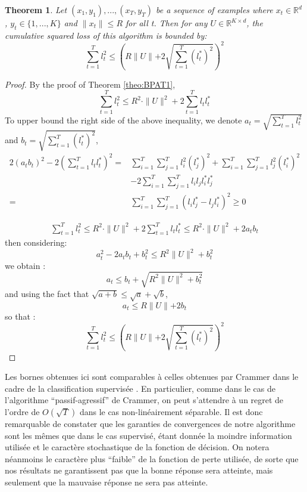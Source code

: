 \documentclass[preprint,12pt,authoryear]{elsarticle}
\newtheorem{theorem}{Theorem}
\begin{document}
\begin{theorem}
	\label{theo:BPAT2}
	Let $(x_1,y_1),...,(x_T,y_T) $ be a sequence of examples where  $x_t\in \mathbb{R}^d$, $y_t \in \{1,...,K\}$ and $\parallel{x_t}\parallel \leqslant R$ for all t. Then for any  $U \in \mathbb{R}^{K\times d}$, the cumulative squared loss of this algorithm is bounded by:
	\[\sum_{t=1}^{T}l_t^2 \leqslant \left(R\parallel{U}\parallel+2 \sqrt{\sum_{t=1}^{T}(l_t^{\ast})^2}\right)^2 \]
\end{theorem}
\begin{proof}
	By the proof of Theorem \ref{theo:BPAT1}, 
	\[\sum_{t=1}^{T}l_t^2 \leqslant R^2\cdot \parallel{U}\parallel^2 + 2\sum_{t=1}^{T}l_t l_t^{\ast}\]
	To upper bound the right side of the above inequality, we denote $a_t = \sqrt{\sum_{t=1}^{T}l_t^2}$ and $b_t = \sqrt{\sum_{t=1}^{T}(l_t^{\ast})^2}$, 
	\begin{align}
	2(a_tb_t)^2-2(\sum_{t=1}^{T}l_tl_t^{\ast})^2 =& \sum_{i=1}^{T}\sum_{j=1}^{T}l_i^2(l_j^{\ast})^2+\sum_{i=1}^{T}\sum_{j=1}^{T}l_j^2(l_i^{\ast})^2 \nonumber\\
	&- 2\sum_{i=1}^{T}\sum_{j=1}^{T}l_il_jl_i^{\ast}l_j^{\ast}\nonumber\\
	=& \sum_{i=1}^{T}\sum_{j=1}^{T}(l_il_j^{\ast}-l_jl_i^{\ast})^2 \geqslant 0 \nonumber
	\end{align}
	
	\begin{align}
	\sum_{t=1}^{T}l_t^2 \leqslant R^2 \cdot \parallel{U}\parallel^2+2\sum_{t=1}^{T}l_tl_t^{\ast}\leqslant R^2 \cdot \parallel{U}\parallel^2+2a_tb_t\nonumber
	\end{align}
	then considering:
	\[a_t^2 -2 a_tb_t+b_t^2\leqslant R^2\parallel{U}\parallel^2+b_t^2\]
	we obtain :
	\[a_t \leqslant b_t+\sqrt{R^2\parallel{U}\parallel^2+b_t^2}\]
	and using the fact that $\sqrt{a+b}\leqslant \sqrt{a}+\sqrt{b}$,
	\[a_t \leqslant R\parallel{U}\parallel+2 b_t\]
	so that :
	\[\sum_{t=1}^{T}l_t^2 \leqslant \left(R\parallel{U}\parallel+2 \sqrt{\sum_{t=1}^{T}(l_t^{\ast})^2}\right)^2 \]
\end{proof}


Les bornes obtenues ici sont comparables  à celles obtenues par Crammer dans le cadre de la classification supervisée  \cite{crammer2006online}. En particulier, comme dans le cas de l'algorithme ``passif-agressif'' de Crammer, on peut s'attendre à un regret de l'ordre de $O(\sqrt{T})$ dans le cas non-linéairement séparable. Il est donc remarquable de constater que les garanties de convergences de notre algorithme sont les mêmes que dans le cas supervisé, étant donnée la moindre information utilisée et le caractère stochastique de la fonction de décision. On notera néanmoins le caractère plus ``faible'' de la fonction de perte utilisée, de sorte que nos résultats ne garantissent pas que la bonne réponse sera atteinte, mais seulement que la mauvaise réponse ne sera pas atteinte.
\end{document}
